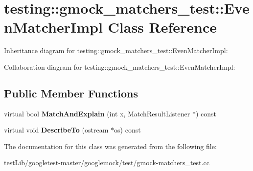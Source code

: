 \hypertarget{classtesting_1_1gmock__matchers__test_1_1EvenMatcherImpl}{}\section{testing\+:\+:gmock\+\_\+matchers\+\_\+test\+:\+:Even\+Matcher\+Impl Class Reference}
\label{classtesting_1_1gmock__matchers__test_1_1EvenMatcherImpl}


Inheritance diagram for testing\+:\+:gmock\+\_\+matchers\+\_\+test\+:\+:Even\+Matcher\+Impl\+:


Collaboration diagram for testing\+:\+:gmock\+\_\+matchers\+\_\+test\+:\+:Even\+Matcher\+Impl\+:
\subsection*{Public Member Functions}
\begin{DoxyCompactItemize}
\item 
\mbox{\label{classtesting_1_1gmock__matchers__test_1_1EvenMatcherImpl_a0ca990403daf3856cda897e4b1a02ae4}} 
virtual bool {\bfseries Match\+And\+Explain} (int x, Match\+Result\+Listener $\ast$) const
\item 
\mbox{\label{classtesting_1_1gmock__matchers__test_1_1EvenMatcherImpl_ae72d37964b4004dfa3a04d7b529ad2f9}} 
virtual void {\bfseries Describe\+To} (ostream $\ast$os) const
\end{DoxyCompactItemize}


The documentation for this class was generated from the following file\+:\begin{DoxyCompactItemize}
\item 
test\+Lib/googletest-\/master/googlemock/test/gmock-\/matchers\+\_\+test.\+cc\end{DoxyCompactItemize}
